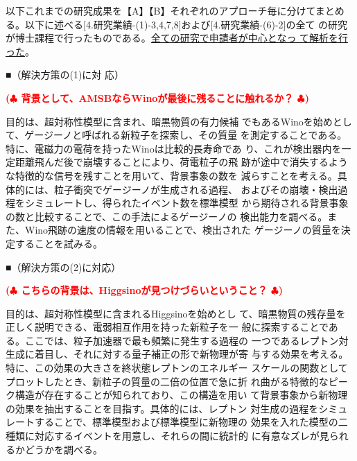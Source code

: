 \documentclass[11pt,a4paper,twoside,dvipdfmx]{jarticle}		%
\def\rem#1{ {\bf\textcolor{red}{($\clubsuit$ #1 $\clubsuit$)}}}
\newcommand{\研究課題名}{粒子加速器を用いた電弱相互作用を持つ新物理の探索}
\newcommand{\研究機関名}{東京大学}
\newcommand{\申請者氏名}{千草颯}
\newcommand{\研究代表者氏名}{\申請者氏名}
\newcommand{\研究期間の最終元号年度}{34}	%
\begin{document}
{以下これまでの研究成果を【A】【B】それぞれのアプローチ毎に分けてまとめ
る。以下に述べる[4.研究業績-(1)-3,4,7,8]および[4.研究業績-(6)-2]の全て
の研究が博士課程で行ったものである。\ul{全ての研究で申請者が中心となっ
て解析を行った}。

■（解決方策の(1)に対
応）

\rem{背景として、AMSBならWinoが最後に残ることに触れるか？}

 目的は、超対称性模型に含まれ、暗黒物質の有力候補
でもあるWinoを始めとして、ゲージーノと呼ばれる新粒子を探索し、その質量
を測定することである。特に、電磁力の電荷を持ったWinoは比較的長寿命であ
り、これが検出器内を一定距離飛んだ後で崩壊することにより、荷電粒子の飛
跡が途中で消失するような特徴的な信号を残すことを用いて、背景事象の数を
減らすことを考える。具体的には、粒子衝突でゲージーノが生成される過程、
およびその崩壊・検出過程をシミュレートし、得られたイベント数を標準模型
から期待される背景事象の数と比較することで、この手法によるゲージーノの
検出能力を調べる。また、Wino飛跡の速度の情報を用いることで、検出された
ゲージーノの質量を決定することを試みる。

■（解決方策の(2)に対応）

\rem{こちらの背景は、Higgsinoが見つけづらいということ？}

 目的は、超対称性模型に含まれるHiggsinoを始めとし
て、暗黒物質の残存量を正しく説明できる、電弱相互作用を持った新粒子を一
般に探索することである。ここでは、粒子加速器で最も頻繁に発生する過程の
一つであるレプトン対生成に着目し、それに対する量子補正の形で新物理が寄
与する効果を考える。特に、この効果の大きさを終状態レプトンのエネルギー
スケールの関数としてプロットしたとき、新粒子の質量の二倍の位置で急に折
れ曲がる特徴的なピーク構造が存在することが知られており、この構造を用い
て背景事象から新物理の効果を抽出することを目指す。具体的には、レプトン
対生成の過程をシミュレートすることで、標準模型および標準模型に新物理の
効果を入れた模型の二種類に対応するイベントを用意し、それらの間に統計的
に有意なズレが見られるかどうかを調べる。

\vspace*{1mm}


\vspace*{1mm}

}
\end{document}
